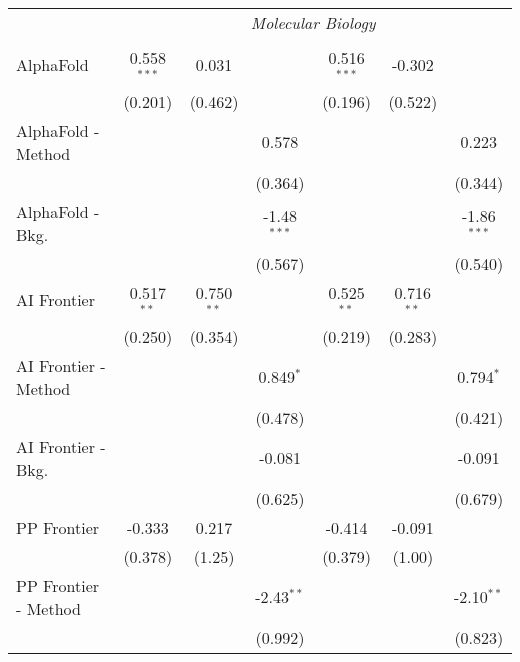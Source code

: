 \begin{tabular}{lcccccc}
 & \multicolumn{6}{c}{\textit{Molecular Biology}} \\ \\
   AlphaFold            & 0.558$^{***}$ & 0.031        &               & 0.516$^{***}$ & -0.302       &   \\   
                        & (0.201)       & (0.462)      &               & (0.196)       & (0.522)      &   \\   
   AlphaFold - Method   &               &              & 0.578         &               &              & 0.223\\   
                        &               &              & (0.364)       &               &              & (0.344)\\   
   AlphaFold - Bkg.     &               &              & -1.48$^{***}$ &               &              & -1.86$^{***}$\\   
                        &               &              & (0.567)       &               &              & (0.540)\\   
   AI Frontier          & 0.517$^{**}$  & 0.750$^{**}$ &               & 0.525$^{**}$  & 0.716$^{**}$ &   \\   
                        & (0.250)       & (0.354)      &               & (0.219)       & (0.283)      &   \\   
   AI Frontier - Method &               &              & 0.849$^{*}$   &               &              & 0.794$^{*}$\\   
                        &               &              & (0.478)       &               &              & (0.421)\\   
   AI Frontier - Bkg.   &               &              & -0.081        &               &              & -0.091\\   
                        &               &              & (0.625)       &               &              & (0.679)\\   
   PP Frontier          & -0.333        & 0.217        &               & -0.414        & -0.091       &   \\   
                        & (0.378)       & (1.25)       &               & (0.379)       & (1.00)       &   \\   
   PP Frontier - Method &               &              & -2.43$^{**}$  &               &              & -2.10$^{**}$\\   
                        &               &              & (0.992)       &               &              & (0.823)\\   

\end{tabular}
